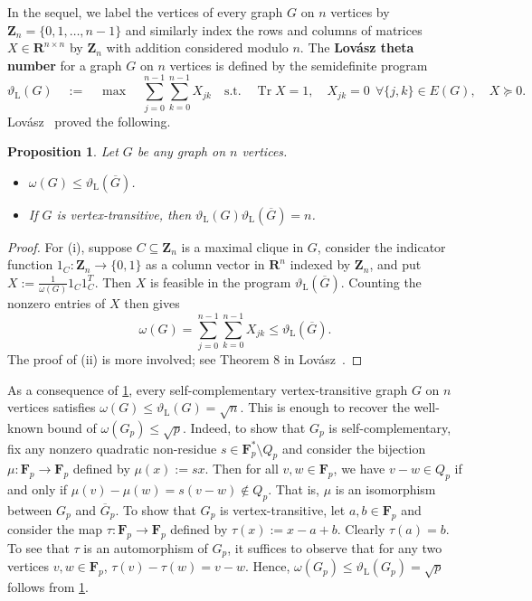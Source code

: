 \documentclass[]{spie}  %
\newtheorem{prop}[thm]{Proposition}
\begin{document}
In the sequel, we label the vertices of every graph $G$ on $n$ vertices by $\mathbf{Z}_n = \{0, 1, \ldots, n - 1\}$ and similarly index the rows and columns of matrices $X \in \mathbf{R}^{n \times n}$ by $\mathbf{Z}_n$ with addition considered modulo $n$.  The \textbf{Lov\'{a}sz theta number} for a graph $G$ on $n$ vertices is defined by the semidefinite program
\[
\vartheta_{\operatorname{L}}(G)
\quad
:=
\quad
\operatorname{max}  
\quad
\displaystyle \sum_{j = 0}^{n-1} \sum_{k = 0}^{n-1} X_{jk}
\quad
\text{s.t.}
\quad
\operatorname{Tr}X=1,
\quad
X_{jk}=0 ~~\forall\{j,k\}\in E(G),
\quad
X\succeq0.
\]
Lov\'{a}sz~\cite{lovasz79} proved the following.

\begin{prop}\label{prop:theta properties}
Let $G$ be any graph on $n$ vertices.
\begin{itemize}
\item[(i)] $\omega(G) \leq \vartheta_{\operatorname{L}}(\overline{G})$.
\item[(ii)] If $G$ is vertex-transitive, then $\vartheta_{\operatorname{L}}(G)\vartheta_{\operatorname{L}}(\overline{G}) = n$.
\end{itemize}
\end{prop}
\begin{proof}
For (i), suppose $C \subseteq \mathbf{Z}_n$ is a maximal clique in $G$, consider the indicator function $1_C\colon \mathbf{Z}_n \rightarrow \{0,1\}$ as a column vector in $\mathbf{R}^n$ indexed by $\mathbf{Z}_n$, and put $X := \frac{1}{\omega(G)} 1_C 1_C^T$.  Then $X$ is feasible in the program $\vartheta_{\operatorname{L}}(\overline{G})$.
Counting the nonzero entries of $X$ then gives
\[
\omega(G) = \sum_{j = 0}^{n - 1} \sum_{k = 0}^{n - 1} X_{jk} \leq \vartheta_{\operatorname{L}}(\overline{G}).
\]
The proof of (ii) is more involved; see Theorem 8 in Lov\'{a}sz~\cite{lovasz79}.
\end{proof}

As a consequence of \cref{prop:theta properties}, every self-complementary vertex-transitive graph $G$ on $n$ vertices satisfies $\omega(G) \leq \vartheta_{\operatorname{L}}(G) = \sqrt{n}$.  This is enough to recover the well-known bound of $\omega(G_p) \leq \sqrt{p}$.  Indeed, to show that $G_p$ is self-complementary, fix any nonzero quadratic non-residue $s \in \mathbf{F}_p^* \setminus Q_p$ and consider the bijection $\mu \colon \mathbf{F}_p \rightarrow \mathbf{F}_p$ defined by $\mu(x) := sx$.  Then for all $v,w \in \mathbf{F}_p$, we have $v - w \in Q_p$ if and only if $\mu(v) - \mu(w) = s(v - w) \not \in Q_p$.  That is, $\mu$ is an isomorphism between $G_p$ and $\overline{G}_p$.  To show that $G_p$ is vertex-transitive, let $a,b \in \mathbf{F}_p$ and consider the map $\tau \colon \mathbf{F}_p \rightarrow \mathbf{F}_p$ defined by $\tau(x) := x - a + b$.  Clearly $\tau(a) = b$.  To see that $\tau$ is an automorphism of $G_p$, it suffices to observe that for any two vertices $v,w \in \mathbf{F}_p$, $\tau(v) - \tau(w) = v - w$.  Hence, $\omega(G_p) \leq \vartheta_{\operatorname{L}}(G_p) = \sqrt{p}$ follows from \cref{prop:theta properties}.
\end{document}
